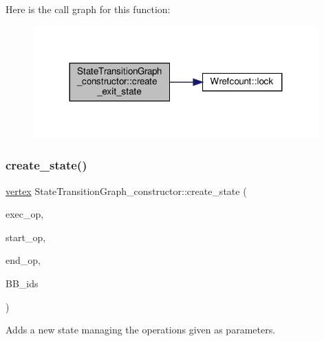 Here is the call graph for this function\+:
\nopagebreak
\begin{figure}[H]
\begin{center}
\leavevmode
\includegraphics[width=311pt]{de/dbb/classStateTransitionGraph__constructor_abe773f14021e94e12138829387c8fb54_cgraph}
\end{center}
\end{figure}
\mbox{\label{classStateTransitionGraph__constructor_a196fb8190c401239b77cbceb52215d85}} 
\subsubsection{\texorpdfstring{create\+\_\+state()}{create\_state()}}
{\footnotesize\ttfamily \hyperlink{graph_8hpp_abefdcf0544e601805af44eca032cca14}{vertex} State\+Transition\+Graph\+\_\+constructor\+::create\+\_\+state (\begin{DoxyParamCaption}\item[{const std\+::list$<$ \hyperlink{graph_8hpp_abefdcf0544e601805af44eca032cca14}{vertex} $>$ \&}]{exec\+\_\+op,  }\item[{const std\+::list$<$ \hyperlink{graph_8hpp_abefdcf0544e601805af44eca032cca14}{vertex} $>$ \&}]{start\+\_\+op,  }\item[{const std\+::list$<$ \hyperlink{graph_8hpp_abefdcf0544e601805af44eca032cca14}{vertex} $>$ \&}]{end\+\_\+op,  }\item[{const \hyperlink{classCustomOrderedSet}{Custom\+Ordered\+Set}$<$ unsigned int $>$ \&}]{B\+B\+\_\+ids }\end{DoxyParamCaption})}



Adds a new state managing the operations given as parameters. 


